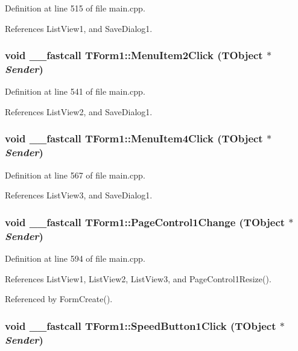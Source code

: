 Definition at line 515 of file main.cpp.

References ListView1, and SaveDialog1.\hypertarget{classTForm1_aa4a9501874d8b9736ef9c6ab19d93da}{
\subsubsection[MenuItem2Click]{\setlength{\rightskip}{0pt plus 5cm}void \_\-\_\-fastcall TForm1::MenuItem2Click (TObject $\ast$ {\em Sender})}}
\label{classTForm1_aa4a9501874d8b9736ef9c6ab19d93da}




Definition at line 541 of file main.cpp.

References ListView2, and SaveDialog1.\hypertarget{classTForm1_1c52133d24858202380937319bed525c}{
\subsubsection[MenuItem4Click]{\setlength{\rightskip}{0pt plus 5cm}void \_\-\_\-fastcall TForm1::MenuItem4Click (TObject $\ast$ {\em Sender})}}
\label{classTForm1_1c52133d24858202380937319bed525c}




Definition at line 567 of file main.cpp.

References ListView3, and SaveDialog1.\hypertarget{classTForm1_9830055131dd01fedd0c8212edec6a9b}{
\subsubsection[PageControl1Change]{\setlength{\rightskip}{0pt plus 5cm}void \_\-\_\-fastcall TForm1::PageControl1Change (TObject $\ast$ {\em Sender})}}
\label{classTForm1_9830055131dd01fedd0c8212edec6a9b}




Definition at line 594 of file main.cpp.

References ListView1, ListView2, ListView3, and PageControl1Resize().

Referenced by FormCreate().\hypertarget{classTForm1_cfd8fc7d5e071f91d545cf71cd3e525c}{
\subsubsection[SpeedButton1Click]{\setlength{\rightskip}{0pt plus 5cm}void \_\-\_\-fastcall TForm1::SpeedButton1Click (TObject $\ast$ {\em Sender})}}
\label{classTForm1_cfd8fc7d5e071f91d545cf71cd3e525c}




